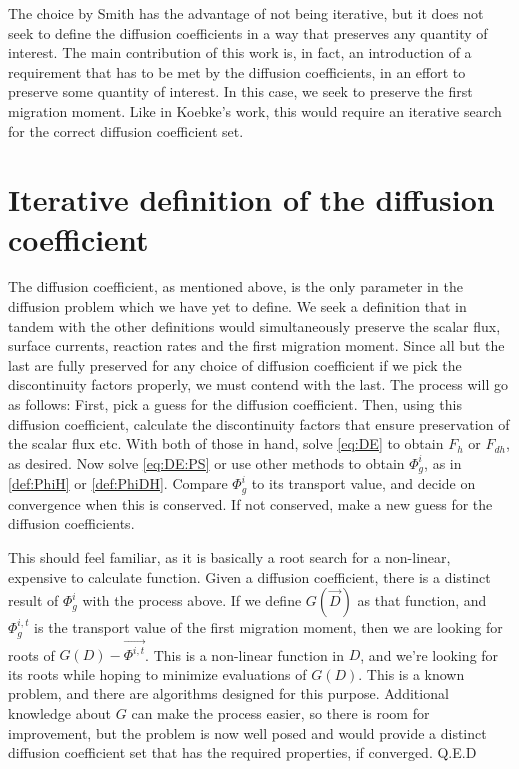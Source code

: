 \documentclass[a4paper,letterpaper,12pt,oneside,draft]{article}
\begin{document}
    The choice by Smith has the advantage of not being iterative, but it does not seek to define the diffusion coefficients in a way that preserves any quantity of interest.
    The main contribution of this work is, in fact, an introduction of a requirement that has to be met by the diffusion coefficients, in an effort to preserve some quantity of interest.
    In this case, we seek to preserve the first migration moment.
    Like in Koebke's work, this would require an iterative search for the correct diffusion coefficient set.
    
\section{Iterative definition of the diffusion coefficient}
    The diffusion coefficient, as mentioned above, is the only parameter in the diffusion problem which we have yet to define.
    We seek a definition that in tandem with the other definitions would simultaneously preserve the scalar flux, surface currents, reaction rates and the first migration moment.
    Since all but the last are fully preserved for any choice of diffusion coefficient if we pick the discontinuity factors properly, we must contend with the last.
    The process will go as follows:
    First, pick a guess for the diffusion coefficient.
    Then, using this diffusion coefficient, calculate the discontinuity factors that ensure preservation of the scalar flux etc.
    With both of those in hand, solve \cref{eq:DE} to obtain $F_h$ or $F_{dh}$, as desired.
    Now solve \cref{eq:DE:PS} or use other methods to obtain $\Phi_g^i$, as in \cref{def:PhiH} or \cref{def:PhiDH}.
    Compare $\Phi_g^i$ to its transport value, and decide on convergence when this is conserved.
    If not conserved, make a new guess for the diffusion coefficients.
    
    This should feel familiar, as it is basically a root search for a non-linear, expensive to calculate function.
    Given a diffusion coefficient, there is a distinct result of $\Phi_g^i$ with the process above. If we define $G(\vec{D})$ as that function, and $\Phi_g^{i,t}$ is the transport value of the first migration moment, then we are looking for roots of $G(D)-\vec{\Phi^{i,t}}$. 
    This is a non-linear function in $D$, and we're looking for its roots while hoping to minimize evaluations of $G(D)$.
    This is a known problem, and there are algorithms designed for this purpose.
    Additional knowledge about $G$ can make the process easier, so there is room for improvement, but the problem is now well posed and would provide a distinct diffusion coefficient set that has the required properties, if converged.\newline
    Q.E.D
\end{document}
